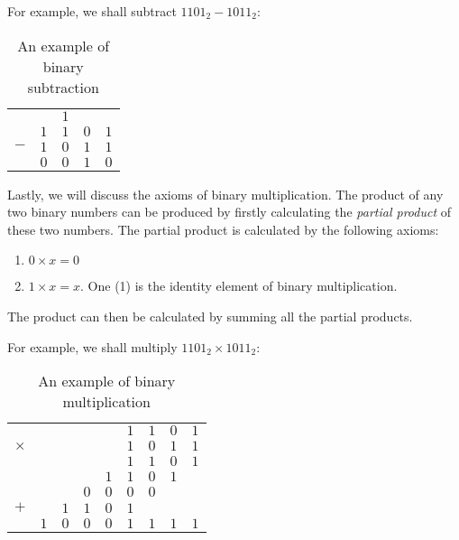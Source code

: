 For example, we shall subtract $1101_2 - 1011_2$:

\begin{table}[ht]
    \centering
    \begin{tabular}{c cccc}
        $ $ & $ $ & $1$ & $ $ & \\
        $ $ & $1$ & $1$ & $0$ & $1$ \\
        $-$ & $1$ & $0$ & $1$ & $1$ \\
        \hline
        $ $ & $0$ & $0$ & $1$ & $0$ \\
    \end{tabular}
    \caption{An example of binary subtraction}
\end{table}

Lastly, we will discuss the axioms of binary multiplication. The product of any two binary
numbers can be produced by firstly calculating the \textit{partial product} of these two
numbers. The partial product is calculated by the following axioms:

\begin{enumerate}
    \item $0 \times x = 0$
    \item $1 \times x = x$. One (1) is the identity element of binary multiplication.
\end{enumerate}

The product can then be calculated by summing all the partial products.

For example, we shall multiply $1101_2 \times 1011_2$:

\begin{table}[ht]
    \centering
    \begin{tabular}{c cccccccc}
        $ $      & $ $ & $ $ & $ $ & $ $ & $1$ & $1$ & $0$ & $1$ \\
        $\times$ & $ $ & $ $ & $ $ & $ $ & $1$ & $0$ & $1$ & $1$ \\
        \hline
        $ $ & $ $ & $ $ & $ $ & $ $ & $1$ & $1$ & $0$ & $1$ \\
        $ $ & $ $ & $ $ & $ $ & $1$ & $1$ & $0$ & $1$ & $ $ \\
        $ $ & $ $ & $ $ & $0$ & $0$ & $0$ & $0$ & $ $ & $ $ \\
        $+$ & $ $ & $1$ & $1$ & $0$ & $1$ & $ $ & $ $ & $ $ \\
        \hline
        $ $ & $1$ & $0$ & $0$ & $0$ & $1$ & $1$ & $1$ & $1$ \\
    \end{tabular}
    \caption{An example of binary multiplication}
\end{table}